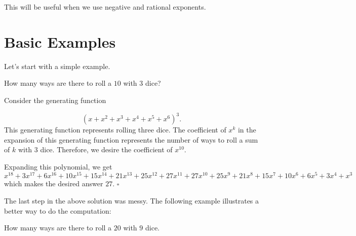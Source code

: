 \documentclass{article}
\begin{document}
This will be useful when we use negative and rational exponents.

\section{Basic Examples}
Let's start with a simple example.
\begin{exam}
How many ways are there to roll a $10$ with $3$ dice?
\end{exam}
\begin{sol}
Consider the generating function

\[(x+x^2+x^3+x^4+x^5+x^6)^{3}.\]
This generating function represents rolling three dice. The coefficient of $x^k$ in the expansion of this generating function represents the number of ways to roll a sum of $k$ with $3$ dice. Therefore, we desire the coefficient of $x^{10}$.

Expanding this polynomial, we get
\[x^{18} + 3 x^{17} + 6 x^{16} + 10 x^{15} + 15 x^{14} + 21 x^{13} + 25 x^{12} + 27 x^{11} + 27 x^{10} + 25 x^9 + 21 x^8 + 15 x^7 + 10 x^6 + 6 x^5 + 3 x^4 + x^3\]
which makes the desired answer $27$. $\square$
\end{sol}
\bigskip

The last step in the above solution was messy. The following example illustrates a better way to do the computation:

\begin{exam}
How many ways are there to roll a $20$ with $9$ dice.
\end{exam}
\end{document}
